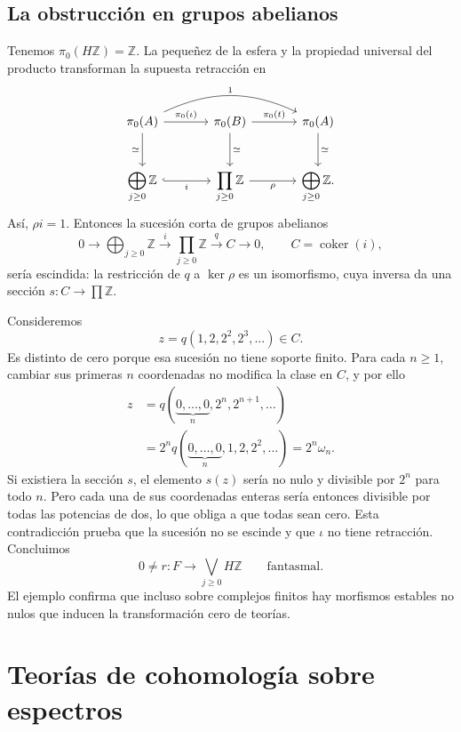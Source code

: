 \subsection{La obstrucción en grupos abelianos}
Tenemos $\pi_0(H\mathbb Z)=\mathbb Z$. La pequeñez de la esfera y la propiedad universal del producto transforman la supuesta retracción en
\[
\begin{tikzcd}[column sep=large,row sep=large]
\pi_0(A)\arrow[r,"\pi_0(\iota)"]\arrow[rr,bend left=25,"1"]\arrow[d,"\simeq"']
&\pi_0(B)\arrow[r,"\pi_0(t)"]\arrow[d,"\simeq"]
&\pi_0(A)\arrow[d,"\simeq"]\\
\displaystyle\bigoplus_{j\ge0}\mathbb Z\arrow[r,hook,"i"']
&\displaystyle\prod_{j\ge0}\mathbb Z\arrow[r,"\rho"']
&\displaystyle\bigoplus_{j\ge0}\mathbb Z.
\end{tikzcd}
\]
Así, $\rho i=1$. Entonces la sucesión corta de grupos abelianos
\[
0\longrightarrow\bigoplus_{j\ge0}\mathbb Z
\xrightarrow{\ i\ }\prod_{j\ge0}\mathbb Z
\xrightarrow{\ q\ }C\longrightarrow0,
\qquad C=\operatorname{coker}(i),
\]
sería escindida: la restricción de $q$ a $\ker\rho$ es un isomorfismo, cuya inversa da una sección $s\colon C\to\prod\mathbb Z$.

Consideremos
\[
z=q(1,2,2^2,2^3,\ldots)\in C.
\]
Es distinto de cero porque esa sucesión no tiene soporte finito. Para cada $n\ge1$, cambiar sus primeras $n$ coordenadas no modifica la clase en $C$, y por ello
\[
\begin{aligned}
z&=q(\underbrace{0,\ldots,0}_{n},2^n,2^{n+1},\ldots)\\
&=2^n q(\underbrace{0,\ldots,0}_{n},1,2,2^2,\ldots)
=2^n\omega_n.
\end{aligned}
\]
Si existiera la sección $s$, el elemento $s(z)$ sería no nulo y divisible por $2^n$ para todo $n$. Pero cada una de sus coordenadas enteras sería entonces divisible por todas las potencias de dos, lo que obliga a que todas sean cero. Esta contradicción prueba que la sucesión no se escinde y que $\iota$ no tiene retracción. Concluimos
\[
0\ne r\colon F\longrightarrow\bigvee_{j\ge0}H\mathbb Z
\qquad\text{fantasmal}.
\]
El ejemplo confirma que incluso sobre complejos finitos hay morfismos estables no nulos que inducen la transformación cero de teorías.

\section{Teorías de cohomología sobre espectros}

